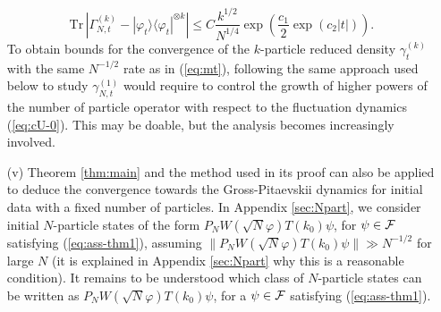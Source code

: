 \documentclass[11pt,a4paper]{article}
\newtheorem{thm}{Theorem}[section]  %
\newcommand{\done}{}
\newcommand{\eps}{\varepsilon}
\newcommand{\bR}{{\mathbb R}}
\newcommand{\bN}{{\mathbb N}}
\newcommand{\tr}{\mbox{Tr}}
\newcommand{\cF}{{\cal F}}
\newcommand{\cH}{{\cal H}}
\begin{document}
\begin{itemize}
\[ \tr \, \left| \Gamma^{(k)}_{N,t} - |\varphi_t \rangle \langle \varphi_t|^{\otimes k} \right| \leq C \frac{k^{1/2}}{N^{1/4}} \exp\left(\frac{c_1}{2} \exp (c_2 |t|)\right).\done \]
To obtain bounds for the convergence of the $k$-particle reduced density $\gamma^{(k)}_t$ with the same $N^{-1/2}$ rate as in (\ref{eq:mt}), following the same approach used below to study $\gamma^{(1)}_{N,t}$ would require to control the growth of higher powers of the number of particle operator with respect to the fluctuation dynamics (\ref{eq:cU-0}). This may be doable, but the analysis becomes increasingly involved. 
\item[(v)] Theorem \ref{thm:main} and the method used in its proof can also be applied to deduce the convergence towards the Gross-Pitaevskii dynamics for initial data with a fixed number of particles. In Appendix \ref{sec:Npart}, we consider initial $N$-particle states of the form 
$P_N W(\sqrt{N} \varphi) T(k_0) \psi$, for $\psi \in \cF$ satisfying (\ref{eq:ass-thm1}), assuming 
$\| P_N W(\sqrt{N} \varphi) T(k_0) \psi \| \gg N^{-1/2}$ for large $N$ (it is explained in Appendix \ref{sec:Npart} why this is a reasonable condition). It remains to be understood which class of $N$-particle states can be written as $P_N W(\sqrt{N} \varphi) T(k_0) \psi$, for a $\psi \in \cF$ satisfying (\ref{eq:ass-thm1}). 
\end{itemize}

\end{document}
